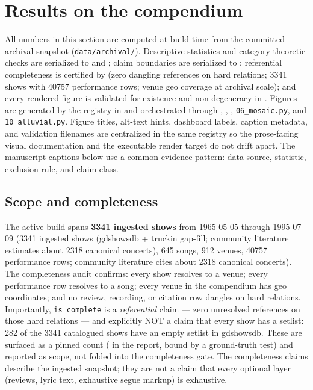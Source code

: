 \documentclass[
]{article}
\begin{document}
\newpage

\section{Results on the compendium}\label{results-on-the-compendium}

\label{sec:results}

All numbers in this section are computed at build time from the
committed archival snapshot (\texttt{data/archival/}). Descriptive
statistics and category-theoretic checks are serialized to
 and
; claim boundaries
are serialized to
; referential
completeness is certified by
 (zero dangling
references on hard relations; 3341 shows with 40757 performance rows;
venue geo coverage at archival scale); and every rendered figure is
validated for existence and non-degeneracy in
. Figures are generated
by the registry in  and orchestrated through
, ,
, \texttt{06\_mosaic.py}, and
\texttt{10\_alluvial.py}. Figure titles, alt-text hints, dashboard
labels, caption metadata, and validation filenames are centralized in
the same registry so the prose-facing visual documentation and the
executable render target do not drift apart. The manuscript captions
below use a common evidence pattern: data source, statistic, exclusion
rule, and claim class.

\subsection{Scope and completeness}\label{scope-and-completeness}

The active build spans \textbf{3341 ingested shows} from 1965-05-05
through 1995-07-09 (3341 ingested shows (gdshowsdb + truckin gap-fill;
community literature estimates about 2318 canonical concerts),
645 songs, 912 venues, 40757 performance rows; community literature
cites about 2318 canonical concerts). The completeness audit
confirms: every show resolves to a venue; every performance row resolves
to a song; every venue in the compendium has geo coordinates; and no
review, recording, or citation row dangles on hard relations.
Importantly, \texttt{is\_complete} is a \emph{referential} claim ---
zero unresolved references on those hard relations --- and explicitly
NOT a claim that every show has a setlist: 282 of the 3341 catalogued
shows have an empty setlist in gdshowsdb. These are surfaced as a pinned
count ( in the report, bound by
a ground-truth test) and reported as scope, not folded into the
completeness gate. The completeness claims describe the ingested
snapshot; they are not a claim that every optional layer (reviews, lyric
text, exhaustive segue markup) is exhaustive.
\end{document}

